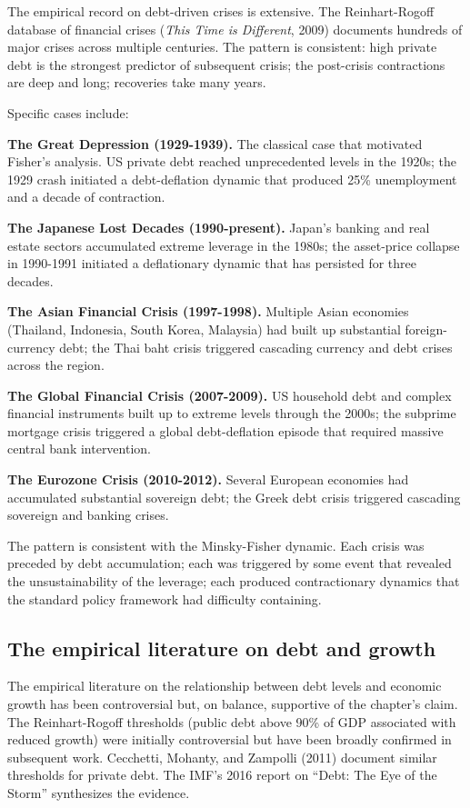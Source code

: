 The empirical record on debt-driven crises is extensive. The
Reinhart-Rogoff database of financial crises (\emph{This Time is
Different}, 2009) documents hundreds of major crises across
multiple centuries. The pattern is consistent: high private debt
is the strongest predictor of subsequent crisis; the post-crisis
contractions are deep and long; recoveries take many years.

Specific cases include:

\textbf{The Great Depression (1929-1939).} The classical case
that motivated Fisher's analysis. US private debt reached
unprecedented levels in the 1920s; the 1929 crash initiated a
debt-deflation dynamic that produced 25\% unemployment and a
decade of contraction.

\textbf{The Japanese Lost Decades (1990-present).} Japan's
banking and real estate sectors accumulated extreme leverage in
the 1980s; the asset-price collapse in 1990-1991 initiated a
deflationary dynamic that has persisted for three decades.

\textbf{The Asian Financial Crisis (1997-1998).} Multiple Asian
economies (Thailand, Indonesia, South Korea, Malaysia) had built
up substantial foreign-currency debt; the Thai baht crisis
triggered cascading currency and debt crises across the region.

\textbf{The Global Financial Crisis (2007-2009).} US household
debt and complex financial instruments built up to extreme levels
through the 2000s; the subprime mortgage crisis triggered a global
debt-deflation episode that required massive central bank
intervention.

\textbf{The Eurozone Crisis (2010-2012).} Several European
economies had accumulated substantial sovereign debt; the Greek
debt crisis triggered cascading sovereign and banking crises.

The pattern is consistent with the Minsky-Fisher dynamic. Each
crisis was preceded by debt accumulation; each was triggered by
some event that revealed the unsustainability of the leverage;
each produced contractionary dynamics that the standard policy
framework had difficulty containing.

\subsection{The empirical literature on debt and growth}

The empirical literature on the relationship between debt levels
and economic growth has been controversial but, on balance,
supportive of the chapter's claim. The Reinhart-Rogoff thresholds
(public debt above 90\% of GDP associated with reduced growth)
were initially controversial but have been broadly confirmed in
subsequent work. Cecchetti, Mohanty, and Zampolli (2011) document
similar thresholds for private debt. The IMF's 2016 report on
``Debt: The Eye of the Storm'' synthesizes the evidence.

